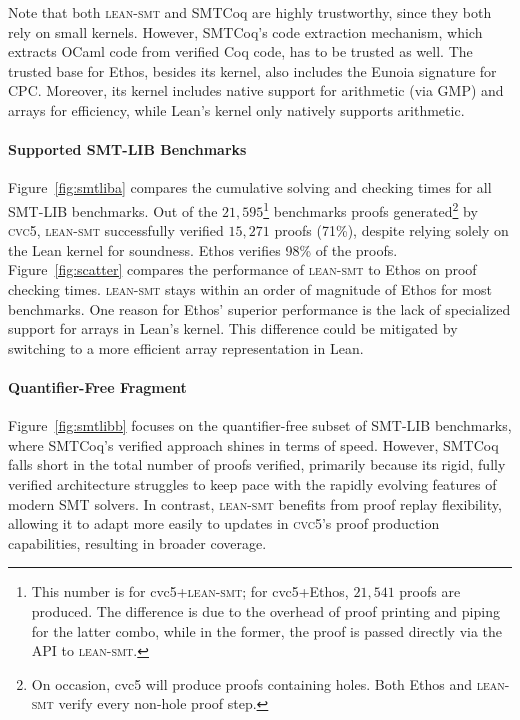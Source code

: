 \documentclass[runningheads]{llncs}
\newcommand{\cvcv}{\textsc{cvc5}\xspace}
\newcommand{\tactic}{\textsc{lean-smt}\xspace}
\begin{document}
Note that both \tactic and SMTCoq are highly trustworthy, since they
both rely on small kernels.
%
However, SMTCoq's
code extraction mechanism, which extracts OCaml code from verified Coq
code, has to be trusted as well.
%
The trusted base for Ethos, besides its kernel, also includes the Eunoia
signature for CPC. Moreover, its kernel includes native support for arithmetic
(via GMP) and arrays for efficiency, while Lean's kernel only natively supports
arithmetic.
%

\paragraph{Supported SMT-LIB Benchmarks}
Figure~\ref{fig:smtliba} compares the cumulative solving and checking times for all SMT-LIB benchmarks.
%
Out of the $21,595$\footnote{This number is for cvc5+\tactic; for
  cvc5+Ethos, $21,541$ proofs are produced. The difference is due to the
  overhead of proof printing and piping for the latter combo, while in the
  former, the proof is passed directly via the API to \tactic.}
benchmarks proofs generated\footnote{On occasion, cvc5 will produce proofs
  containing holes. Both Ethos and \tactic verify every non-hole proof
  step.} by \cvcv, \tactic successfully verified $15,271$ proofs (71\%),
despite relying solely on the Lean kernel for
soundness. Ethos verifies 98\% of the proofs.
%
Figure~\ref{fig:scatter} compares the performance of \tactic to Ethos on proof
checking times.
%
\tactic stays within an order of magnitude of Ethos for most benchmarks. One
reason for Ethos' superior performance is the lack of specialized
support for arrays in Lean's kernel.
%
This difference could be mitigated by switching to a more efficient array
representation in Lean.

\paragraph{Quantifier-Free Fragment}
Figure~\ref{fig:smtlibb} focuses on the quantifier-free subset of SMT-LIB benchmarks, where SMTCoq's verified approach shines in terms of speed.
%
However, SMTCoq falls short in the total number of proofs verified, primarily because its rigid, fully verified architecture struggles to keep pace with the rapidly evolving features of modern SMT solvers.
%
In contrast, \tactic benefits from proof replay flexibility, allowing it to adapt more easily to updates in \cvcv's proof production capabilities, resulting in broader coverage.

\smallskip
\end{document}
